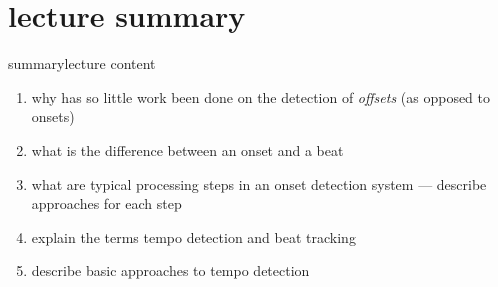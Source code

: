         \section[summary]{lecture summary}
        \begin{frame}{summary}{lecture content}
            \begin{enumerate}
                \item   why has so little work been done on the detection of \textit{offsets} (as opposed to onsets)
                \smallskip
                \item<2->   what is the difference between an onset and a beat
                \smallskip
                \item<3->   what are typical processing steps in an onset detection system --- describe approaches for each step
                \smallskip
                \item<4->   explain the terms tempo detection and beat tracking
                \smallskip
                \item<5->   describe basic approaches to tempo detection
            \end{enumerate}
        \end{frame}


